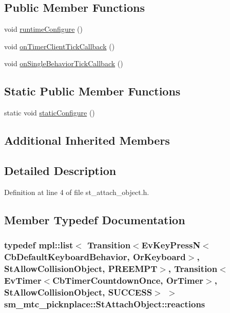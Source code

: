 \subsection*{Public Member Functions}
\begin{DoxyCompactItemize}
\item 
void \hyperlink{structsm__mtc__picknplace_1_1StAttachObject_af622f60515edeb66be26e6e20c7d7838}{runtime\+Configure} ()
\item 
void \hyperlink{structsm__mtc__picknplace_1_1StAttachObject_a24bfe97caf6313a9de2273d3bd5904a3}{on\+Timer\+Client\+Tick\+Callback} ()
\item 
void \hyperlink{structsm__mtc__picknplace_1_1StAttachObject_aeff7f103e4b76187b7283ac531f4fcd3}{on\+Single\+Behavior\+Tick\+Callback} ()
\end{DoxyCompactItemize}
\subsection*{Static Public Member Functions}
\begin{DoxyCompactItemize}
\item 
static void \hyperlink{structsm__mtc__picknplace_1_1StAttachObject_a9602ade3bf3dbd8a5feb45feb8dd0c32}{static\+Configure} ()
\end{DoxyCompactItemize}
\subsection*{Additional Inherited Members}


\subsection{Detailed Description}


Definition at line 4 of file st\+\_\+attach\+\_\+object.\+h.



\subsection{Member Typedef Documentation}
\subsubsection[{\texorpdfstring{reactions}{reactions}}]{\setlength{\rightskip}{0pt plus 5cm}typedef mpl\+::list$<$ Transition$<$Ev\+Key\+PressN$<$Cb\+Default\+Keyboard\+Behavior, {\bf Or\+Keyboard}$>$, {\bf St\+Allow\+Collision\+Object}, {\bf P\+R\+E\+E\+M\+PT}$>$, Transition$<$Ev\+Timer$<$Cb\+Timer\+Countdown\+Once, {\bf Or\+Timer}$>$, {\bf St\+Allow\+Collision\+Object}, {\bf S\+U\+C\+C\+E\+SS}$>$ $>$ {\bf sm\+\_\+mtc\+\_\+picknplace\+::\+St\+Attach\+Object\+::reactions}}\hypertarget{structsm__mtc__picknplace_1_1StAttachObject_a7ea0cc91807fb4b6d699953de36aef53}{}\label{structsm__mtc__picknplace_1_1StAttachObject_a7ea0cc91807fb4b6d699953de36aef53}


